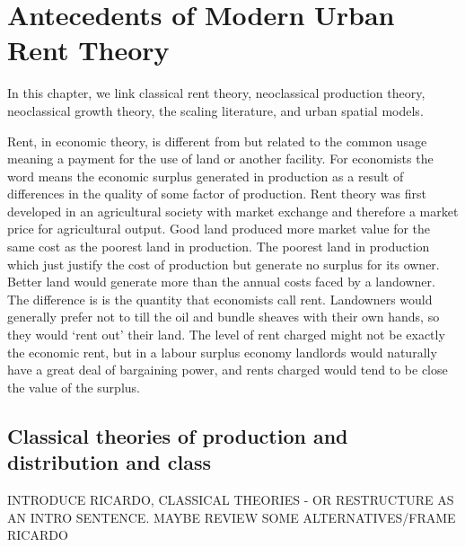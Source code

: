 \chapter{Antecedents of Modern Urban Rent Theory} \label{chapter-rent}
In this chapter, we link classical rent theory, neoclassical production theory, neoclassical growth theory, the scaling literature, and urban spatial models. 


Rent, in economic theory, is different from but related to the common usage meaning a payment for the use of land or another facility.  For economists the word means the economic  surplus generated in production as a result of differences in the quality of some factor of production.  Rent theory was first developed in an agricultural society with market exchange and therefore a market price for agricultural output. Good land produced more market value for the same cost as the poorest land in production. The poorest land in production which just justify the cost of production but generate no surplus for its owner. Better land would generate more than the annual costs faced by a landowner. The difference is is the quantity that economists call rent. Landowners would generally prefer not to till the oil and bundle sheaves with their own hands, so they would `rent out' their land. The level of rent charged might not be exactly the economic rent, but in a labour surplus economy landlords would naturally have a great deal of bargaining power, and rents charged would tend to be close the value of the surplus. 


\section{Classical theories of production and distribution and class}
INTRODUCE RICARDO, CLASSICAL THEORIES - OR RESTRUCTURE AS AN INTRO SENTENCE.
MAYBE REVIEW SOME ALTERNATIVES/FRAME RICARDO

